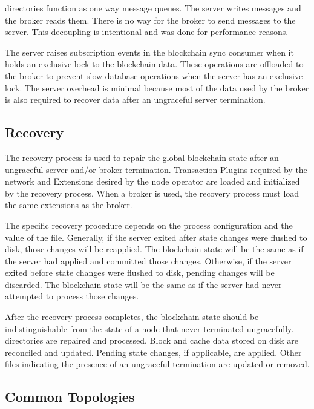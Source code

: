  directories function as one way message queues.
The server writes messages and the broker reads them.
There is no way for the broker to send messages to the server.
This decoupling is intentional and was done for performance reasons.

The server raises subscription events in the blockchain sync consumer  when it holds an exclusive lock to the blockchain data.
These operations are offloaded to the broker to prevent slow database operations when the server has an exclusive lock.
The server overhead is minimal because most of the data used by the broker is also required to recover data after an ungraceful server termination.

\subsection{Recovery}

The recovery process is used to repair the global blockchain state after an ungraceful server and/or broker termination.
Transaction Plugins required by the network and \codenamespace Extensions desired by the node operator are loaded and initialized by the recovery process.
When a broker is used, the recovery process must load the same extensions as the broker.

The specific recovery procedure depends on the process configuration and the value of the  file.
Generally, if the server exited after state changes were flushed to disk, those changes will be reapplied.
The blockchain state will be the same as if the server had applied and committed those changes.
Otherwise, if the server exited before state changes were flushed to disk, pending changes will be discarded.
The blockchain state will be the same as if the server had never attempted to process those changes.

After the recovery process completes, the blockchain state should be indistinguishable from the state of a node that never terminated ungracefully.
 directories are repaired and processed.
Block and cache data stored on disk are reconciled and updated.
Pending state changes, if applicable, are applied.
Other files indicating the presence of an ungraceful termination are updated or removed.

\subsection{Common Topologies}

